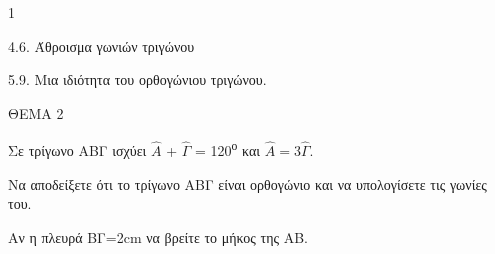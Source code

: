 \begin{ylh}{1}
    \item 4.6. Άθροισμα γωνιών τριγώνου
    \item 5.9. Μια ιδιότητα του ορθογώνιου τριγώνου.
\end{ylh}

ΘΕΜΑ 2

Σε τρίγωνο ΑΒΓ ισχύει $\widehat{Α}$ + $\widehat{\Gamma}$ = 120\textsuperscript{ο} και $\widehat{Α} = 3\widehat{\Gamma}$.

\begin{alist}
\item Να αποδείξετε ότι το τρίγωνο ΑΒΓ είναι ορθογώνιο και να υπολογίσετε τις γωνίες του. 

\item Αν η πλευρά ΒΓ=2cm να βρείτε το μήκος της ΑΒ. 
\end{alist}

